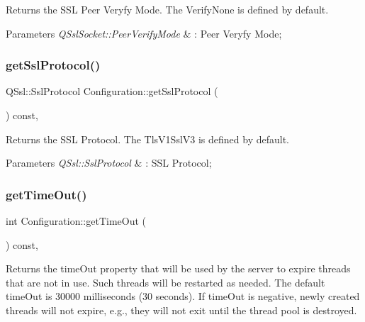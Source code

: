 Returns the S\+SL Peer Veryfy Mode. The Verify\+None is defined by default. 


\begin{DoxyParams}{Parameters}
{\em Q\+Ssl\+Socket\+::\+Peer\+Verify\+Mode} & \+: Peer Veryfy Mode; \\
\hline
\end{DoxyParams}
\mbox{\label{class_configuration_acfe38d1e3f4801c942ad2e57165509f7}} 
\subsubsection{\texorpdfstring{get\+Ssl\+Protocol()}{getSslProtocol()}}
{\footnotesize\ttfamily Q\+Ssl\+::\+Ssl\+Protocol Configuration\+::get\+Ssl\+Protocol (\begin{DoxyParamCaption}{ }\end{DoxyParamCaption}) const\hspace{0.3cm}{\ttfamily [inline]}, {\ttfamily [noexcept]}}



Returns the S\+SL Protocol. The Tls\+V1\+Ssl\+V3 is defined by default. 


\begin{DoxyParams}{Parameters}
{\em Q\+Ssl\+::\+Ssl\+Protocol} & \+: S\+SL Protocol; \\
\hline
\end{DoxyParams}
\mbox{\label{class_configuration_ab39a76ac734b52df96c9c07f71764ae2}} 
\subsubsection{\texorpdfstring{get\+Time\+Out()}{getTimeOut()}}
{\footnotesize\ttfamily int Configuration\+::get\+Time\+Out (\begin{DoxyParamCaption}{ }\end{DoxyParamCaption}) const\hspace{0.3cm}{\ttfamily [inline]}, {\ttfamily [noexcept]}}



Returns the time\+Out property that will be used by the server to expire threads that are not in use. Such threads will be restarted as needed. The default time\+Out is 30000 milliseconds (30 seconds). If time\+Out is negative, newly created threads will not expire, e.\+g., they will not exit until the thread pool is destroyed. 


